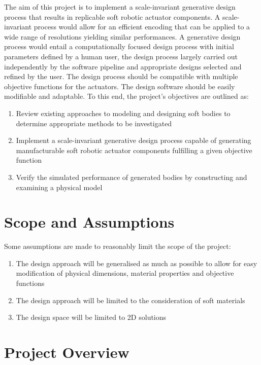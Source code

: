 The aim of this project is to implement a scale-invariant generative design process that results in replicable soft robotic actuator components. A scale-invariant process would allow for an efficient encoding that can be applied to a wide range of resolutions yielding similar performances. A generative design process would entail a computationally focused design process with initial parameters defined by a human user, the design process largely carried out independently by the software pipeline and appropriate designs selected and refined by the user. The design process should be compatible with multiple objective functions for the actuators. The design software should be easily modifiable and adaptable. To this end, the project's objectives are outlined as:

\begin{enumerate}
	\item Review existing approaches to modeling and designing soft bodies to determine appropriate methods to be investigated
	\item Implement a scale-invariant generative design process capable of generating manufacturable soft robotic actuator components fulfilling a given objective function
	\item Verify the simulated performance of generated bodies by constructing and examining a physical model
\end{enumerate}

\section{Scope and Assumptions}

Some assumptions are made to reasonably limit the scope of the project:

\begin{enumerate}
	\item The design approach will be generalised as much as possible to allow for easy modification of physical dimensions, material properties and objective functions
	\item The design approach will be limited to the consideration of soft materials
	\item The design space will be limited to 2D solutions
\end{enumerate}

\section{Project Overview}

